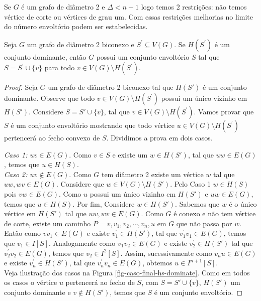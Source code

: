 Se $G$ é um grafo de diâmetro 2 e $\Delta <n-1$ logo temos 2 restrições: 
não temos vértice de corte ou vértices de grau um. Com essas restrições
melhorias no limite do número envoltório podem ser estabelecidas.


\begin{lemma}
     \label{hs-dominante-envoltorio}
     Seja $G$ um grafo de diâmetro 2 biconexo e $S^\prime \subseteq V(G)$. 
     Se $H(S^\prime)$ é um conjunto dominante, então $G$ possui um conjunto envoltório $S$ tal que  $S=S^\prime \cup \{v\}$ para todo $v\in V(G) \setminus H(S^\prime)$.
\end{lemma}
\begin{proof}
Seja $G$ um grafo de diâmetro 2 biconexo tal que $H(S')$ é um conjunto dominante. Observe que todo $v \in V(G)\setminus H(S^\prime)$ possui um único vizinho em $H(S')$. Considere $S=S' \cup \{v\}$, tal que $v \in  V(G) \setminus H(S^\prime)$. Vamos provar que $S$ é um conjunto envoltório mostrando que todo vértice $u \in V(G)\setminus H(S^\prime)$ pertencerá ao fecho convexo de $S$. Dividimos a prova em dois casos.

{\it Caso 1: $uv \in E(G)$}. Como $v \in S$ e existe um $w \in H(S')$, tal que $uw \in E(G)$, temos que $u \in H(S)$.\\

{\it Caso 2: $uv \notin E(G)$}. Como $G$ tem diâmetro 2 existe um vértice $w$ tal que $uw, wv \in E(G)$. Considere que $w \in V(G)\setminus H(S')$. Pelo Caso 1 $w \in H(S)$ pois $vw \in E(G)$. Como $u$ possui um único vizinho em $H(S')$ e $uw \in E(G)$, temos que $u \in H(S)$. Por fim, Considere $w \in H(S')$. Sabemos que $w$ é o único vértice em $H(S')$ tal que $uw, wv \in E(G)$. Como $G$ é conexo e não tem vértice de corte, existe um caminho $P= v, v_1, v_2, \cdots,v_n, u$ em $G$ que não passa por $w$. Então como $v v_1 \in E(G)$ e existe $v^{\prime}_{1} \in H(S')$, tal que $v^{\prime}_{1}v_1 \in E(G)$, temos que $v_1 \in I[S]$. Analogamente como $v_1v_2 \in E(G)$ e existe $v^{\prime}_{2} \in H(S')$ tal que $v^{\prime}_{2}v_2 \in E(G)$, temos que $v_2 \in I^{2}[S]$. Assim, sucessivamente como $v_n u \in E(G)$ e existe $v^{\prime}_{n} \in H(S')$, tal que $v^{\prime}_{n}v_n \in E(G)$, obtemos $u \in I^{n+1}[S]$.\\

Veja ilustração dos casos na Figura \ref{fig-caso-final-hs-dominate}. Como em todos os casos o vértice $u$ pertencerá ao fecho de $S$, com $S= S' \cup \{v\}$, $H(S')$ um conjunto dominante e $v \notin H(S')$, temos que $S$ é um conjunto envoltório.




\end{proof}
